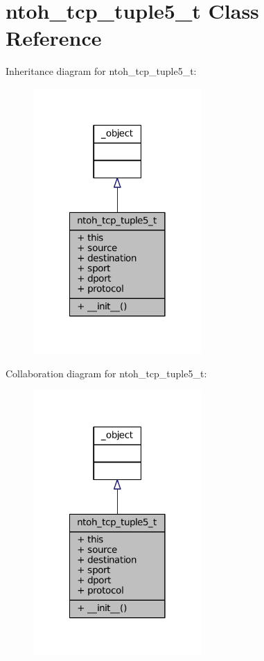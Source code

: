 \hypertarget{classlibntoh_1_1ntoh__tcp__tuple5__t}{\section{ntoh\-\_\-tcp\-\_\-tuple5\-\_\-t Class Reference}
\label{classlibntoh_1_1ntoh__tcp__tuple5__t}
}


Inheritance diagram for ntoh\-\_\-tcp\-\_\-tuple5\-\_\-t\-:
\nopagebreak
\begin{figure}[H]
\begin{center}
\leavevmode
\includegraphics[width=182pt]{classlibntoh_1_1ntoh__tcp__tuple5__t__inherit__graph}
\end{center}
\end{figure}


Collaboration diagram for ntoh\-\_\-tcp\-\_\-tuple5\-\_\-t\-:
\nopagebreak
\begin{figure}[H]
\begin{center}
\leavevmode
\includegraphics[width=182pt]{classlibntoh_1_1ntoh__tcp__tuple5__t__coll__graph}
\end{center}
\end{figure}
